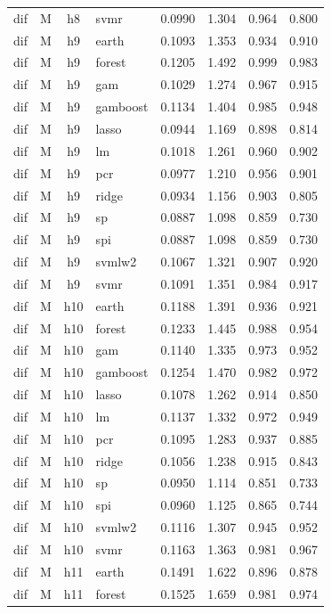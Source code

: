 \begin{ThreePartTable}
\begin{longtable}[t]{llclcccc}
dif & M & h8 & svmr & 0.0990 & 1.304 & 0.964 & 0.800\\
\addlinespace
dif & M & h9 & earth & 0.1093 & 1.353 & 0.934 & 0.910\\
dif & M & h9 & forest & 0.1205 & 1.492 & 0.999 & 0.983\\
dif & M & h9 & gam & 0.1029 & 1.274 & 0.967 & 0.915\\
dif & M & h9 & gamboost & 0.1134 & 1.404 & 0.985 & 0.948\\
dif & M & h9 & lasso & 0.0944 & 1.169 & 0.898 & 0.814\\
dif & M & h9 & lm & 0.1018 & 1.261 & 0.960 & 0.902\\
dif & M & h9 & pcr & 0.0977 & 1.210 & 0.956 & 0.901\\
dif & M & h9 & ridge & 0.0934 & 1.156 & 0.903 & 0.805\\
dif & M & h9 & sp & 0.0887 & 1.098 & 0.859 & 0.730\\
dif & M & h9 & spi & 0.0887 & 1.098 & 0.859 & 0.730\\
dif & M & h9 & svmlw2 & 0.1067 & 1.321 & 0.907 & 0.920\\
dif & M & h9 & svmr & 0.1091 & 1.351 & 0.984 & 0.917\\
\addlinespace
dif & M & h10 & earth & 0.1188 & 1.391 & 0.936 & 0.921\\
dif & M & h10 & forest & 0.1233 & 1.445 & 0.988 & 0.954\\
dif & M & h10 & gam & 0.1140 & 1.335 & 0.973 & 0.952\\
dif & M & h10 & gamboost & 0.1254 & 1.470 & 0.982 & 0.972\\
dif & M & h10 & lasso & 0.1078 & 1.262 & 0.914 & 0.850\\
dif & M & h10 & lm & 0.1137 & 1.332 & 0.972 & 0.949\\
dif & M & h10 & pcr & 0.1095 & 1.283 & 0.937 & 0.885\\
dif & M & h10 & ridge & 0.1056 & 1.238 & 0.915 & 0.843\\
dif & M & h10 & sp & 0.0950 & 1.114 & 0.851 & 0.733\\
dif & M & h10 & spi & 0.0960 & 1.125 & 0.865 & 0.744\\
dif & M & h10 & svmlw2 & 0.1116 & 1.307 & 0.945 & 0.952\\
dif & M & h10 & svmr & 0.1163 & 1.363 & 0.981 & 0.967\\
\addlinespace
dif & M & h11 & earth & 0.1491 & 1.622 & 0.896 & 0.878\\
dif & M & h11 & forest & 0.1525 & 1.659 & 0.981 & 0.974\\

\end{longtable}
\end{ThreePartTable}

